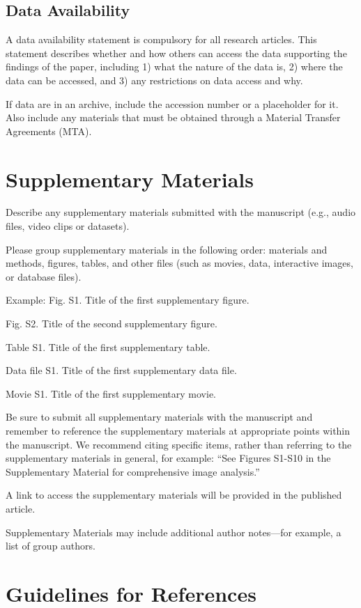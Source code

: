 \documentclass{article}
\begin{document}
\subsection*{Data Availability}
A data availability statement is compulsory for all research articles. This statement describes whether and how others can access the data supporting the findings of the paper, including 1) what the nature of the data is, 2) where the data can be accessed, and 3) any restrictions on data access and why.

If data are in an archive, include the accession number or a placeholder for it. Also include any materials that must be obtained through a Material Transfer Agreements (MTA). 

\section*{Supplementary Materials}
Describe any supplementary materials submitted with the manuscript (e.g., audio files, video clips or datasets). 

Please group supplementary materials in the following order: materials and methods, figures, tables, and other files (such as movies, data, interactive images, or database files). 

\medskip Example:
Fig. S1. Title of the first supplementary figure.

Fig. S2. Title of the second supplementary figure.

Table S1. Title of the first supplementary table.

Data file S1. Title of the first supplementary data file.

Movie S1. Title of the first supplementary movie.

\medskip
Be sure to submit all supplementary materials with the manuscript and remember to reference the supplementary materials at appropriate points within the manuscript. We recommend citing specific items, rather than referring to the supplementary materials in general, for example: ``See Figures S1-S10 in the Supplementary Material for comprehensive image analysis.''

A link to access the supplementary materials will be provided in the published article.

Supplementary Materials may include additional author notes—for example, a list of group authors.

\section*{Guidelines for References}
\end{document}
